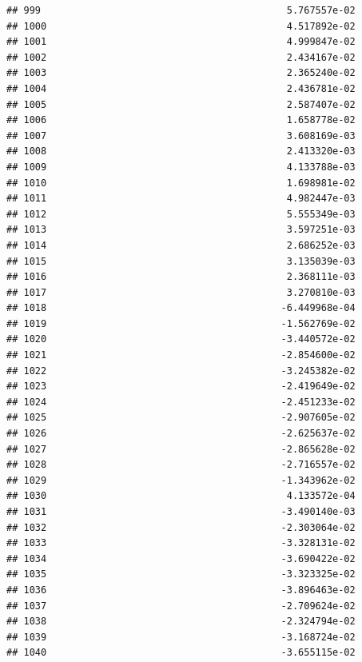 \documentclass[
]{article}
\begin{document}
\begin{verbatim}
## 999                                           5.767557e-02
## 1000                                          4.517892e-02
## 1001                                          4.999847e-02
## 1002                                          2.434167e-02
## 1003                                          2.365240e-02
## 1004                                          2.436781e-02
## 1005                                          2.587407e-02
## 1006                                          1.658778e-02
## 1007                                          3.608169e-03
## 1008                                          2.413320e-03
## 1009                                          4.133788e-03
## 1010                                          1.698981e-02
## 1011                                          4.982447e-03
## 1012                                          5.555349e-03
## 1013                                          3.597251e-03
## 1014                                          2.686252e-03
## 1015                                          3.135039e-03
## 1016                                          2.368111e-03
## 1017                                          3.270810e-03
## 1018                                         -6.449968e-04
## 1019                                         -1.562769e-02
## 1020                                         -3.440572e-02
## 1021                                         -2.854600e-02
## 1022                                         -3.245382e-02
## 1023                                         -2.419649e-02
## 1024                                         -2.451233e-02
## 1025                                         -2.907605e-02
## 1026                                         -2.625637e-02
## 1027                                         -2.865628e-02
## 1028                                         -2.716557e-02
## 1029                                         -1.343962e-02
## 1030                                          4.133572e-04
## 1031                                         -3.490140e-03
## 1032                                         -2.303064e-02
## 1033                                         -3.328131e-02
## 1034                                         -3.690422e-02
## 1035                                         -3.323325e-02
## 1036                                         -3.896463e-02
## 1037                                         -2.709624e-02
## 1038                                         -2.324794e-02
## 1039                                         -3.168724e-02
## 1040                                         -3.655115e-02

\end{verbatim}
\end{document}
